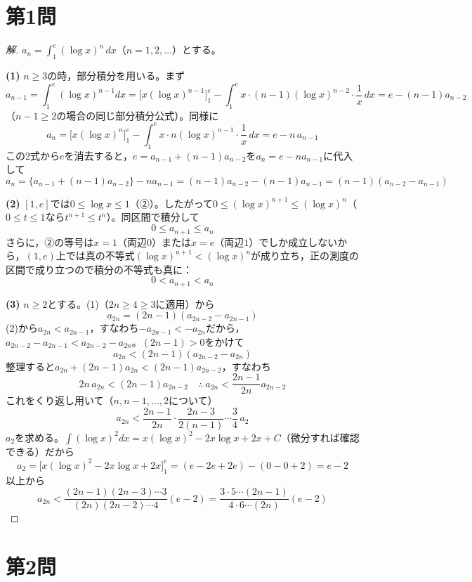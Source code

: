 \documentclass[../main.tex]{subfiles}
\begin{document}
\section*{第1問}

\begin{proof}[解]
  $a_n=\displaystyle\int_1^e(\log x)^n\,dx$（$n=1,2,\dots$）とする。

  \textbf{(1)} $n\ge3$の時，部分積分を用いる。まず
  \[
    a_{n-1}=\int_1^e(\log x)^{n-1}dx=\bigl[x(\log x)^{n-1}\bigr]_1^e-\int_1^ex\cdot(n-1)(\log x)^{n-2}\cdot\frac1x\,dx=e-(n-1)a_{n-2}
  \]
  （$n-1\ge2$の場合の同じ部分積分公式）。同様に
  \[
    a_n=\bigl[x(\log x)^n\bigr]_1^e-\int_1^ex\cdot n(\log x)^{n-1}\cdot\frac1x\,dx=e-n\,a_{n-1}
  \]
  この2式から$e$を消去すると，$e=a_{n-1}+(n-1)a_{n-2}$を$a_n=e-na_{n-1}$に代入して
  \[
    a_n=\{a_{n-1}+(n-1)a_{n-2}\}-na_{n-1}=(n-1)a_{n-2}-(n-1)a_{n-1}=(n-1)(a_{n-2}-a_{n-1})
  \]

  \textbf{(2)} $[1,e]$では$0\le\log x\le1$（②）。したがって$0\le(\log x)^{n+1}\le(\log x)^n$（$0\le t\le1$なら$t^{n+1}\le t^n$）。同区間で積分して
  \[
    0\le a_{n+1}\le a_n
  \]
  さらに，②の等号は$x=1$（両辺$0$）または$x=e$（両辺$1$）でしか成立しないから，$(1,e)$上では真の不等式$(\log x)^{n+1}<(\log x)^n$が成り立ち，正の測度の区間で成り立つので積分の不等式も真に：
  \[
    0<a_{n+1}<a_n
  \]

  \textbf{(3)} $n\ge2$とする。(1)（$2n\ge4\ge3$に適用）から
  \[
    a_{2n}=(2n-1)(a_{2n-2}-a_{2n-1})
  \]
  (2)から$a_{2n}<a_{2n-1}$，すなわち$-a_{2n-1}<-a_{2n}$だから，$a_{2n-2}-a_{2n-1}<a_{2n-2}-a_{2n}$。$(2n-1)>0$をかけて
  \[
    a_{2n}<(2n-1)(a_{2n-2}-a_{2n})
  \]
  整理すると$a_{2n}+(2n-1)a_{2n}<(2n-1)a_{2n-2}$，すなわち
  \[
    2n\,a_{2n}<(2n-1)a_{2n-2} \quad\therefore\ a_{2n}<\frac{2n-1}{2n}a_{2n-2}
  \]
  これをくり返し用いて（$n,n-1,\dots,2$について）
  \[
    a_{2n}<\frac{2n-1}{2n}\cdot\frac{2n-3}{2(n-1)}\cdots\frac34\,a_2
  \]
  $a_2$を求める。$\int(\log x)^2dx=x(\log x)^2-2x\log x+2x+C$（微分すれば確認できる）だから
  \[
    a_2=\bigl[x(\log x)^2-2x\log x+2x\bigr]_1^e=(e-2e+2e)-(0-0+2)=e-2
  \]
  以上から
  \[
    a_{2n}<\frac{(2n-1)(2n-3)\cdots3}{(2n)(2n-2)\cdots4}(e-2)=\frac{3\cdot5\cdots(2n-1)}{4\cdot6\cdots(2n)}(e-2)
  \]
\end{proof}

\newpage

\section*{第2問}
\end{document}
